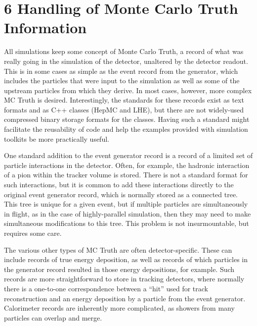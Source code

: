 \documentclass[12pt,a4paper]{article}
\begin{document}
\hypertarget{handling-of-monte-carlo-truth-information}{%
\section{6 Handling of Monte Carlo Truth
Information}\label{handling-of-monte-carlo-truth-information}}

All simulations keep some concept of Monte Carlo Truth, a record of what
was really going in the simulation of the detector, unaltered by the
detector readout. This is in some cases as simple as the event record
from the generator, which includes the particles that were input to the
simulation as well as some of the upstream particles from which they
derive. In most cases, however, more complex MC Truth is desired.
Interestingly, the standards for these records exist as text formats and
as C++ classes (HepMC and LHE), but there are not widely-used compressed
binary storage formats for the classes. Having such a standard might
facilitate the reusability of code and help the examples provided with
simulation toolkits be more practically useful.

One standard addition to the event generator record is a record of a
limited set of particle interactions in the detector. Often, for
example, the hadronic interaction of a pion within the tracker volume is
stored. There is not a standard format for such interactions, but it is
common to add these interactions directly to the original event
generator record, which is normally stored as a connected tree. This
tree is unique for a given event, but if multiple particles are
simultaneously in flight, as in the case of highly-parallel simulation,
then they may need to make simultaneous modifications to this tree. This
problem is not insurmountable, but requires some care.

The various other types of MC Truth are often detector-specific. These
can include records of true energy deposition, as well as records of
which particles in the generator record resulted in those energy
depositions, for example. Such records are more straightforward to store
in tracking detectors, where normally there is a one-to-one
correspondence between a ``hit'' used for track reconstruction and an
energy deposition by a particle from the event generator. Calorimeter
records are inherently more complicated, as showers from many particles
can overlap and merge.
\end{document}
